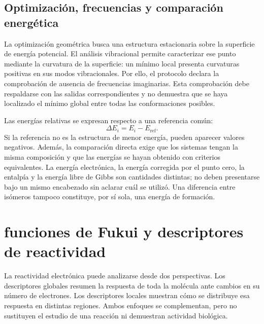 \documentclass[12 pt, letter, oneside]{book}
\begin{document}
\section{Optimización, frecuencias y comparación energética}
La optimización geométrica busca una estructura estacionaria sobre la superficie de energía potencial. El análisis vibracional permite caracterizar ese punto mediante la curvatura de la superficie: un mínimo local presenta curvaturas positivas en sus modos vibracionales. Por ello, el protocolo declara la comprobación de ausencia de frecuencias imaginarias. Esta comprobación debe respaldarse con las salidas correspondientes y no demuestra que se haya localizado el mínimo global entre todas las conformaciones posibles.

Las energías relativas se expresan respecto a una referencia común:
\begin{equation}
 \Delta E_i=E_i-E_{\mathrm{ref}}.
\end{equation}
Si la referencia no es la estructura de menor energía, pueden aparecer valores negativos. Además, la comparación directa exige que los sistemas tengan la misma composición y que las energías se hayan obtenido con criterios equivalentes. La energía electrónica, la energía corregida por el punto cero, la entalpía y la energía libre de Gibbs son cantidades distintas; no deben presentarse bajo un mismo encabezado sin aclarar cuál se utilizó. Una diferencia entre isómeros tampoco constituye, por sí sola, una energía de formación.

\chapter{funciones de Fukui y descriptores de reactividad}
\label{ap:reactividad}

La reactividad electrónica puede analizarse desde dos perspectivas. Los descriptores globales resumen la respuesta de toda la molécula ante cambios en su número de electrones. Los descriptores locales muestran cómo se distribuye esa respuesta en distintas regiones. Ambos enfoques se complementan, pero no sustituyen el estudio de una reacción ni demuestran actividad biológica.
\end{document}
